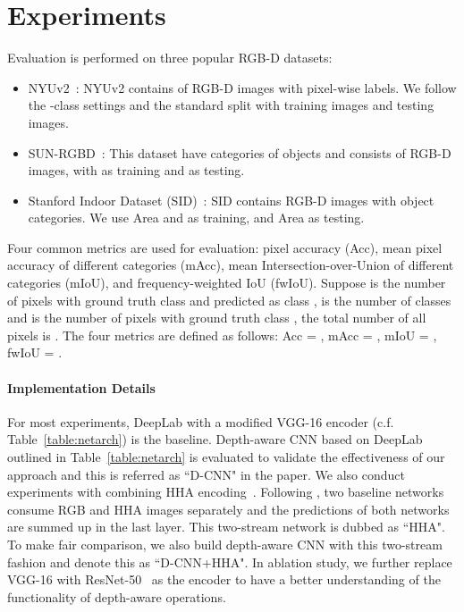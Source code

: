 \section{Experiments}

Evaluation is performed on three popular RGB-D datasets: 
\begin{itemize}
\item NYUv2~\cite{nyuv2}: NYUv2 contains of  RGB-D images with pixel-wise labels. We follow the -class settings and the standard split with  training images and  testing images. 
\item SUN-RGBD~\cite{sunrgbd,Janoch2011dataset}: This dataset have  categories of objects and consists of  RGB-D images, with  as training and  as testing. 
\item Stanford Indoor Dataset (SID)~\cite{2017arXiv170201105A}: SID contains  RGB-D images with  object categories. We use Area  and  as training, and Area  as testing.
\end{itemize}

Four common metrics are used for evaluation: pixel accuracy (Acc), mean pixel accuracy of different categories (mAcc), mean Intersection-over-Union of different categories (mIoU), and frequency-weighted IoU (fwIoU). Suppose  is the number of pixels with ground truth class  and predicted as class ,  is the number of classes and  is the number of pixels with ground truth class , the total number of all pixels is . The four metrics are defined as follows: Acc = , mAcc = , mIoU = , fwIoU = .


\paragraph{\bfseries{Implementation Details}}
For most experiments, DeepLab with a modified VGG-16 encoder (c.f. Table~\ref{table:netarch}) is the baseline. Depth-aware CNN based on DeepLab outlined in Table~\ref{table:netarch} is evaluated to validate the effectiveness of our approach and this is referred as ``D-CNN" in the paper. We also conduct experiments with combining HHA encoding~\cite{eccv14hha}. Following \cite{fcn,xiaojuaniccv17,eigeniccv15}, two baseline networks consume RGB and HHA images separately and the predictions of both networks are summed up in the last layer. This two-stream network is dubbed as ``HHA". To make fair comparison, we also build depth-aware CNN with this two-stream fashion and denote this as ``D-CNN+HHA".
In ablation study, we further replace VGG-16 with ResNet-50~\cite{resnet} as the encoder to have a better understanding of the functionality of depth-aware operations.

